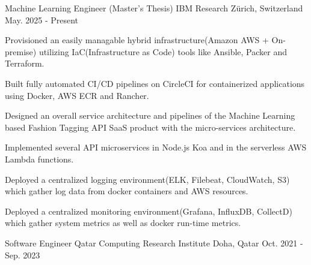 

\begin{cventries}

  \cventry
    {Machine Learning Engineer (Master's Thesis)} %
    {IBM Research} %
    {Zürich, Switzerland} %
    {May. 2025 - Present} %
    {
      \begin{cvitems} %
        \item {Provisioned an easily managable hybrid infrastructure(Amazon AWS + On-premise) utilizing IaC(Infrastructure as Code) tools like Ansible, Packer and Terraform.}
        \item {Built fully automated CI/CD pipelines on CircleCI for containerized applications using Docker, AWS ECR and Rancher.}
        \item {Designed an overall service architecture and pipelines of the Machine Learning based Fashion Tagging API SaaS product with the micro-services architecture.}
        \item {Implemented several API microservices in Node.js Koa and in the serverless AWS Lambda functions.}
        \item {Deployed a centralized logging environment(ELK, Filebeat, CloudWatch, S3) which gather log data from docker containers and AWS resources.}
        \item {Deployed a centralized monitoring environment(Grafana, InfluxDB, CollectD) which gather system metrics as well as docker run-time metrics.}
      \end{cvitems}
    }

  \cventry
    {Software Engineer} %
    {Qatar Computing Research Institute} %
    {Doha, Qatar} %
    {Oct. 2021 - Sep. 2023} %
    {
    }


\end{cventries}

